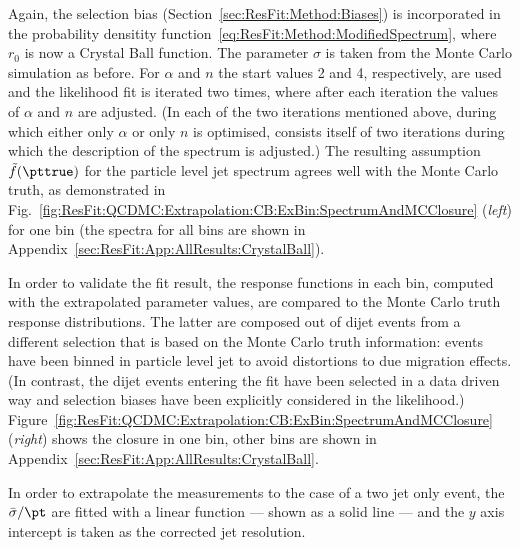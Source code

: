 Again, the selection bias (Section~\ref{sec:ResFit:Method:Biases}) is incorporated in the probability densitity function~\eqref{eq:ResFit:Method:ModifiedSpectrum}, where $r_{0}$ is now a Crystal Ball function.
The parameter $\sigma$ is taken from the Monte Carlo simulation as before.
For $\alpha$ and $n$ the start values 2 and 4, respectively, are used and the likelihood fit is iterated two times, where after each iteration the values of $\alpha$ and $n$ are adjusted.
(In each of the two iterations mentioned above, during which either only $\alpha$ or only $n$ is optimised, consists itself of two iterations during which the description of the spectrum is adjusted.)
The resulting assumption~$\tilde{f}(\pttrue)$ for the particle level jet \pt spectrum agrees well with the Monte Carlo truth, as demonstrated in Fig.~\ref{fig:ResFit:QCDMC:Extrapolation:CB:ExBin:SpectrumAndMCClosure} (\textit{left}) for one \pt bin (the spectra for all \pt bins are shown in Appendix~\ref{sec:ResFit:App:AllResults:CrystalBall}).

In order to validate the fit result, the response functions in each \pt bin, computed with the extrapolated parameter values, are compared to the Monte Carlo truth response distributions.
The latter are composed out of dijet events from a different selection that is based on the Monte Carlo truth information: events have been binned in particle level jet \pt to avoid distortions to due migration effects.
(In contrast, the dijet events entering the fit have been selected in a data driven way and selection biases have been explicitly considered in the likelihood.)
Figure~\ref{fig:ResFit:QCDMC:Extrapolation:CB:ExBin:SpectrumAndMCClosure} (\textit{right}) shows the closure in one \pt bin, other \pt bins are shown in Appendix~\ref{sec:ResFit:App:AllResults:CrystalBall}.





In order to extrapolate the measurements to the case of a two jet only event, the $\bar{\sigma}/\pt$ are fitted with a linear function --- shown as a solid line --- and the $y$ axis intercept is taken as the corrected jet \pt resolution.

